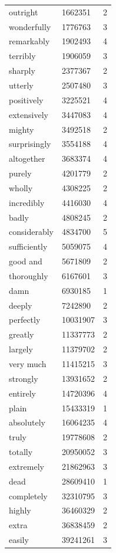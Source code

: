 \documentclass[10pt,letterpaper]{article}
\begin{document}
\begin{table}[ht]
\begin{center}
\begin{tabular}{llc}
    outright & 1662351 & 2 \\ 
    wonderfully & 1776763 & 3 \\ 
    remarkably & 1902493 & 4 \\ 
    terribly & 1906059 & 3 \\ 
    sharply & 2377367 & 2 \\ 
    utterly & 2507480 & 3 \\ 
    positively & 3225521 & 4 \\ 
    extensively & 3447083 & 4 \\ 
    mighty & 3492518 & 2 \\ 
    surprisingly & 3554188 & 4 \\ 
    altogether & 3683374 & 4 \\ 
    purely & 4201779 & 2 \\ 
    wholly & 4308225 & 2 \\ 
    incredibly & 4416030 & 4 \\ 
    badly & 4808245 & 2 \\ 
    considerably & 4834700 & 5 \\ 
    sufficiently & 5059075 & 4 \\ 
    good and & 5671809 & 2 \\ 
    thoroughly & 6167601 & 3 \\ 
    damn & 6930185 & 1 \\ 
    deeply & 7242890 & 2 \\ 
    perfectly & 10031907 & 3 \\ 
    greatly & 11337773 & 2 \\ 
    largely & 11379702 & 2 \\ 
    very much & 11415215 & 3 \\ 
    strongly & 13931652 & 2 \\ 
    entirely & 14720396 & 4 \\ 
    plain & 15433319 & 1 \\ 
    absolutely & 16064235 & 4 \\ 
    truly & 19778608 & 2 \\ 
    totally & 20950052 & 3 \\ 
    extremely & 21862963 & 3 \\ 
    dead & 28609410 & 1 \\ 
    completely & 32310795 & 3 \\ 
    highly & 36460329 & 2 \\ 
    extra & 36838459 & 2 \\ 
    easily & 39241261 & 3 \\ 

\end{tabular}
\end{center}
\end{table}
\end{document}
